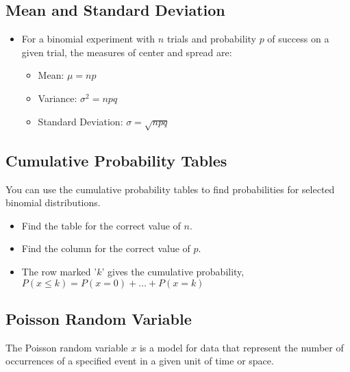 \documentclass[12pt, letterpaper]{article}
\begin{document}
        \subsection{Mean and Standard Deviation}
            \begin{itemize}
                \item For a binomial experiment with $n$ trials and probability $p$ of success on a given trial, the measures of center and spread are: \smallskip
                    \begin{itemize}
                        \item Mean: $\mu = np$
                        \item Variance: $\sigma ^2 = npq$
                        \item Standard Deviation: $\sigma = \sqrt{npq}$
                    \end{itemize}
            \end{itemize}
        \subsection{Cumulative Probability Tables}
            You can use the cumulative probability tables to find probabilities for selected binomial distributions.
            \begin{itemize}
                \item Find the table for the correct value of $n$.
                \item Find the column for the correct value of $p$.
                \item The row marked '$k$' gives the cumulative probability, \smallskip \\ $P(x \leq k) = P(x=0) + \dots + P(x = k)$
            \end{itemize}
        \subsection{Poisson Random Variable}
            The Poisson random variable $x$ is a model for data that represent the number of occurrences of a specified event in a given unit of time or space.
\end{document}

